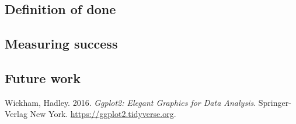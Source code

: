 \documentclass[
]{article}
\newlength{\cslhangindent}
\newenvironment{CSLReferences}[2] %
 {\begin{list}{}{%
  \setlength{\itemindent}{0pt}
  \setlength{\leftmargin}{0pt}
  \setlength{\parsep}{0pt}
  \ifodd #1
   \setlength{\leftmargin}{\cslhangindent}
   \setlength{\itemindent}{-1\cslhangindent}
  \fi
  \setlength{\itemsep}{#2\baselineskip}}}
 {\end{list}}
\begin{document}
\subsection{Definition of done}\label{definition-of-done}

\subsection{Measuring success}\label{measuring-success}

\subsection{Future work}\label{future-work}

\protect{}\label{refs}
\begin{CSLReferences}{1}{1}
Wickham, Hadley. 2016. \emph{Ggplot2: Elegant Graphics for Data
Analysis}. Springer-Verlag New York.
\url{https://ggplot2.tidyverse.org}.

\end{CSLReferences}
\end{document}
